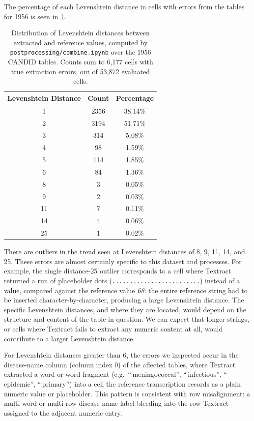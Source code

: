 \documentclass[12pt]{article}
\begin{document}
The percentage of each Levenshtein distance in cells with errors from the tables for 1956 is seen in \cref{tab:lev_dist}.

\begin{table}[h]
\centering
\begin{tabular}{ccc}
\hline
\textbf{Levenshtein Distance} & \textbf{Count} & \textbf{Percentage} \\
\hline
1  & 2356 & 38.14\% \\
2  & 3194 & 51.71\% \\
3  & 314  & 5.08\%  \\
4  & 98   & 1.59\%  \\
5  & 114  & 1.85\%  \\
6  & 84   & 1.36\%  \\
8  & 3    & 0.05\%  \\
9  & 2    & 0.03\%  \\
11 & 7    & 0.11\%  \\
14 & 4    & 0.06\%  \\
25 & 1    & 0.02\%  \\
\hline
\end{tabular}
\caption{Distribution of Levenshtein distances between extracted and reference values, computed by \texttt{postprocessing/combine.ipynb} over the 1956 CANDID tables. Counts sum to 6{,}177 cells with true extraction errors, out of 53{,}872 evaluated cells.}
\label{tab:lev_dist}
\end{table}

There are outliers in the trend seen at Levenshtein distances of 8, 9, 11, 14, and 25. These errors are almost certainly specific to this dataset and processes. For example, the single distance-25 outlier corresponds to a cell where Textract returned a run of placeholder dots (\texttt{.........................}) instead of a value, compared against the reference value \emph{68}: the entire reference string had to be inserted character-by-character, producing a large Levenshtein distance. The specific Levenshtein distances, and where they are located, would depend on the structure and content of the table in question. We can expect that longer strings, or cells where Textract fails to extract any numeric content at all, would contribute to a larger Levenshtein distance.

For Levenshtein distances greater than 6, the errors we inspected occur in the disease-name column (column index 0) of the affected tables, where Textract extracted a word or word-fragment (e.g.\ ``\,meningococcal'', ``\,infectious'', ``\,epidemic'', ``\,primary'') into a cell the reference transcription records as a plain numeric value or placeholder. This pattern is consistent with row misalignment: a multi-word or multi-row disease-name label bleeding into the row Textract assigned to the adjacent numeric entry.
\end{document}
